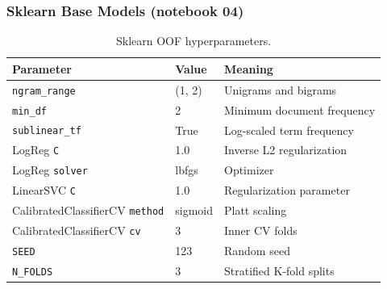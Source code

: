 \documentclass[11pt,a4paper]{article}
\begin{document}
\subsubsection{Sklearn Base Models (notebook 04)}
\begin{table}[htbp]
  \centering
  \caption{Sklearn OOF hyperparameters.}
  \label{tab:sklearn-hparams}
  \small
  \begin{tabular}{@{}lll@{}}
    \toprule
    Parameter & Value & Meaning \\
    \midrule
    \texttt{ngram\_range} & (1, 2) & Unigrams and bigrams \\
    \texttt{min\_df} & 2 & Minimum document frequency \\
    \texttt{sublinear\_tf} & True & Log-scaled term frequency \\
    LogReg \texttt{C} & 1.0 & Inverse L2 regularization \\
    LogReg \texttt{solver} & lbfgs & Optimizer \\
    LinearSVC \texttt{C} & 1.0 & Regularization parameter \\
    CalibratedClassifierCV \texttt{method} & sigmoid & Platt scaling \\
    CalibratedClassifierCV \texttt{cv} & 3 & Inner CV folds \\
    \texttt{SEED} & 123 & Random seed \\
    \texttt{N\_FOLDS} & 3 & Stratified K-fold splits \\
    \bottomrule
  \end{tabular}
\end{table}
\end{document}
